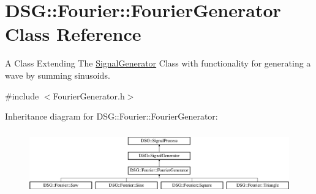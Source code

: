 \hypertarget{classDSG_1_1Fourier_1_1FourierGenerator}{\section{D\-S\-G\-:\-:Fourier\-:\-:Fourier\-Generator Class Reference}
\label{classDSG_1_1Fourier_1_1FourierGenerator}
}


A Class Extending The \hyperlink{classDSG_1_1SignalGenerator}{Signal\-Generator} Class with functionality for generating a wave by summing sinusoids.  




{\ttfamily \#include $<$Fourier\-Generator.\-h$>$}

Inheritance diagram for D\-S\-G\-:\-:Fourier\-:\-:Fourier\-Generator\-:\begin{figure}[H]
\begin{center}
\leavevmode
\includegraphics[height=2.814070cm]{classDSG_1_1Fourier_1_1FourierGenerator}
\end{center}
\end{figure}
